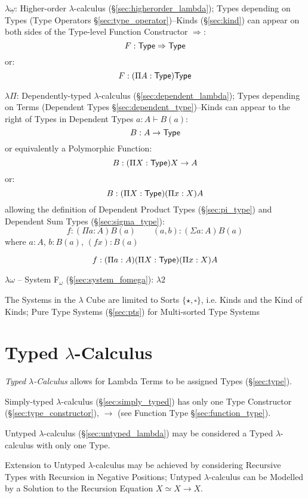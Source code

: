 $\lambda\underline{\omega}$: Higher-order $\lambda$-calculus
(\S\ref{sec:higherorder_lambda}); Types depending on Types (Type
Operators \S\ref{sec:type_operator})--Kinds (\S\ref{sec:kind}) can
appear on both sides of the Type-level Function Constructor
$\Rightarrow$:
\[
   F:\mathsf{Type} \Rightarrow \mathsf{Type}
\]
or:
\[
  F:(\Pi A:\mathsf{Type}) \mathsf{Type}
\]

$\lambda\Pi$: Dependently-typed $\lambda$-calculus
(\S\ref{sec:dependent_lambda}); Types depending on Terms (Dependent
Types \S\ref{sec:dependent_type})--Kinds can appear to the right of
Types in Dependent Types $a:A \vdash B(a)$:
\[
  B : A \rightarrow \mathsf{Type}
\]
or equivalently a Polymorphic Function:
\[
  B : (\Pi X:\mathsf{Type}) X \rightarrow A
\]
or:
\[
  B : (\Pi X:\mathsf{Type}) (\Pi x:X) A
\]
allowing the definition of Dependent Product Types
(\S\ref{sec:pi_type}) and Dependent Sum Types
(\S\ref{sec:sigma_type}):
\[
  f : (\Pi a:A) B(a) \quad\quad (a,b) : (\Sigma a:A) B(a)
\]
where $a:A$, $b:B(a)$, $(f x):B(a)$

\[
  f : (\Pi a:A) (\Pi X:\mathsf{Type}) (\Pi x:X) A
\]

$\lambda\omega$ -- System F$_\omega$ (\S\ref{sec:system_fomega}): $\lambda2$

\fist The Systems in the $\lambda$ Cube are limited to Sorts
$\{\star,\square\}$, i.e. Kinds and the Kind of Kinds; Pure Type
Systems (\S\ref{sec:pts}) for Multi-sorted Type Systems %



\section{Typed $\lambda$-Calculus}\label{sec:typed_lambda}

\emph{Typed $\lambda$-Calculus} allows for Lambda Terms to be assigned
Types (\S\ref{sec:type}).

Simply-typed $\lambda$-calculus (\S\ref{sec:simply_typed}) has only
one Type Constructor (\S\ref{sec:type_constructor}), $\rightarrow$
(see Function Type \S\ref{sec:function_type}).

Untyped $\lambda$-calculus (\S\ref{sec:untyped_lambda}) may be
considered a Typed $\lambda$-calculus with only one Type.

Extension to Untyped $\lambda$-calculus may be achieved by
considering Recursive Types with Recursion in Negative Positions;
Untyped $\lambda$-calculus can be Modelled by a Solution to the
Recursion Equation $X \simeq X \rightarrow X$. \cite{wadler12}

